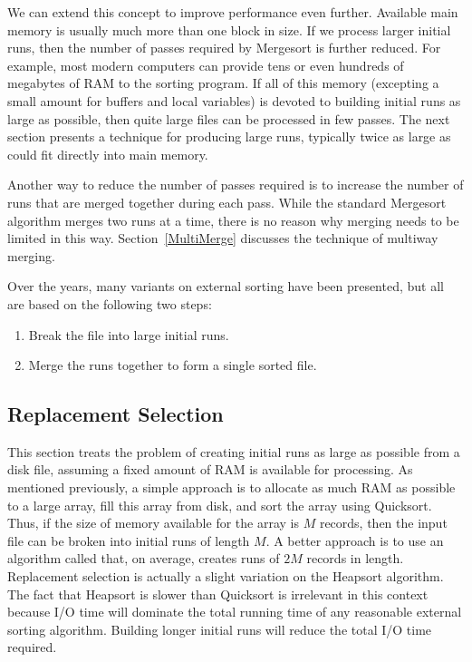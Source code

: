 We can extend this concept to improve performance even
further.
Available main memory is usually much more than one block in size.
If we process larger initial runs, then the number of passes
required by Mergesort is further reduced.
For example, most modern computers can provide tens or even hundreds
of megabytes of RAM to the sorting program.
If all of this memory (excepting a small amount for buffers
and local variables) is devoted to building initial runs as large as
possible, then quite large files can be processed in few passes.
The next section presents a technique for producing large runs,
typically twice as large as could fit directly into main memory.

Another way to reduce the number of passes required is to increase
the number of runs that are merged together during each pass.
While the standard Mergesort algorithm merges two runs at a time,
there is no reason why merging needs to be limited in this way.
Section~\ref{MultiMerge} discusses the technique of multiway merging.

Over the years, many variants on external sorting have been
presented, but all are based on the following two steps:

\begin{enumerate}
\item
Break the file into large initial runs.

\item
Merge the runs together to form a single sorted file.
\end{enumerate}

\subsection{Replacement Selection}
\label{RepSelSec}

This section treats the problem of creating initial runs as large as
possible from a disk file, assuming a fixed amount of RAM is available
for processing.
As mentioned previously, a simple approach is to
allocate as much RAM as possible to a large array, fill this array
from disk, and sort the array using
Quicksort.
Thus, if the size of memory available for the array is \(M\) records,
then the input file can be broken into initial runs of length \(M\).
A better approach is to use an algorithm called
that, on average, creates runs of \(2M\) records in length.
Replacement selection is actually a slight variation on the Heapsort
algorithm.
The fact that Heapsort is slower than Quicksort is
irrelevant in this context because I/O time will dominate the total
running time of any reasonable external sorting algorithm.
Building longer initial runs will reduce the total I/O time required.

